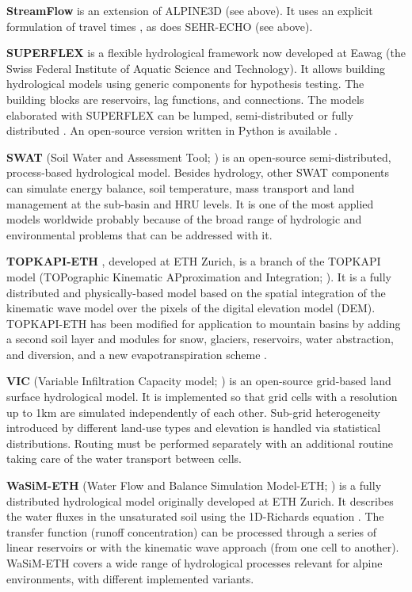\documentclass[10pt,a4paper]{article}
\begin{document}
\textbf{StreamFlow} is an extension of ALPINE3D (see above). It uses an
explicit formulation of travel times \citep{Comola2015}, as does
SEHR-ECHO (see above). 

\textbf{SUPERFLEX} \citep{Fenicia2011a,Kavetski2011} is a flexible hydrological framework
now developed at Eawag (the Swiss Federal Institute of Aquatic Science
and Technology). It allows building hydrological models using generic
components for hypothesis testing. The building blocks are reservoirs,
lag functions, and connections. The models elaborated with SUPERFLEX can
be lumped, semi-distributed \citep{Fenicia2016} or fully
distributed \citep{Hostache2020}. An open-source version written in Python
is available \citep{Molin2020}.

\textbf{SWAT} (Soil Water and Assessment Tool; \citealp{Arnold_1998}) is an
open-source semi-distributed, process-based hydrological model. Besides
hydrology, other SWAT components can simulate energy balance, soil
temperature, mass transport and land management at the sub-basin and HRU
levels. It is one of the most applied models worldwide probably because
of the broad range of hydrologic and environmental problems that can be
addressed with it.

\textbf{TOPKAPI-ETH} \citep{Finger_2011,Ragettli_2012}, developed at ETH Zurich, is a
branch of the TOPKAPI model (TOPographic Kinematic APproximation and
Integration; \citealp{Todini1995,Todini2002,Liu2002,Ciarapica_2002}). 
It is a fully distributed and physically-based model based on the spatial integration 
of the kinematic wave model over the pixels of the digital elevation model (DEM).
TOPKAPI-ETH has been modified for application to mountain basins by
adding a second soil layer and modules for snow, glaciers, reservoirs,
water abstraction, and diversion, and a new evapotranspiration
scheme \citep{Finger_2011,Finger_2012,Fatichi_2015a}.

\textbf{VIC} (Variable Infiltration Capacity model; \citealp{Liang1994a}) is
an open-source grid-based land surface hydrological model. It is
implemented so that grid cells with a resolution up to 1km are simulated
independently of each other. Sub-grid heterogeneity introduced by
different land-use types and elevation is handled via statistical
distributions. Routing must be performed separately with an additional
routine taking care of the water transport between cells.

\textbf{WaSiM-ETH} (Water Flow and Balance Simulation
Model-ETH; \citealp{Schulla2007,Schulla2009}) is a fully distributed hydrological
model originally developed at ETH Zurich. It describes the water fluxes
in the unsaturated soil using the 1D-Richards
equation \citep{Richards1931}. The transfer function (runoff
concentration) can be processed through a series of linear reservoirs or
with the kinematic wave approach (from one cell to another). WaSiM-ETH
covers a wide range of hydrological processes relevant for alpine
environments, with different implemented variants.
\end{document}
